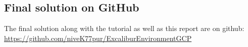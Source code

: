 \subsection{Final solution on GitHub}\label{app:github}

The final solution along with the tutorial as well as this report are
on github: \url{https://github.com/niveK77pur/ExcaliburEnvironmentGCP}
